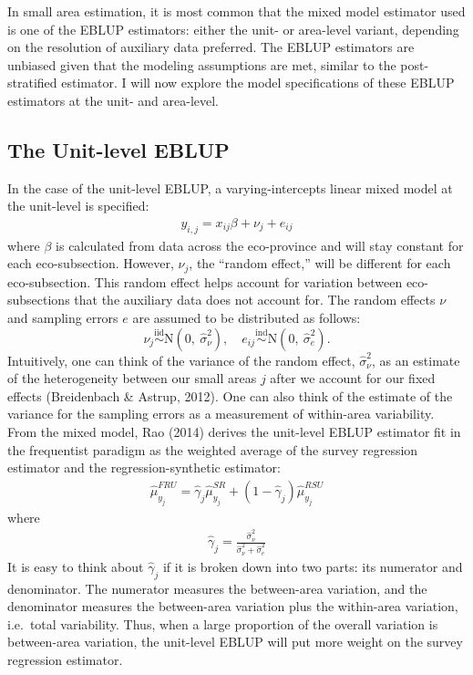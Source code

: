 \documentclass[12pt,twoside]{reedthesis}
\begin{document}
In small area estimation, it is most common that the mixed model estimator used is one of the EBLUP estimators: either the unit- or area-level variant, depending on the resolution of auxiliary data preferred. The EBLUP estimators are unbiased given that the modeling assumptions are met, similar to the post-stratified estimator. I will now explore the model specifications of these EBLUP estimators at the unit- and area-level.

\hypertarget{the-unit-level-eblup}{%
\subsection{The Unit-level EBLUP}\label{the-unit-level-eblup}}

In the case of the unit-level EBLUP, a varying-intercepts linear mixed model at the unit-level is specified:
\begin{align}
y_{i,j} = x_{ij} \beta + \nu_j + e_{ij} \label{eq:unit-mod}
\end{align}
where \(\beta\) is calculated from data across the eco-province and will stay constant for each eco-subsection. However, \(\nu_j\), the ``random effect,'' will be different for each eco-subsection. This random effect helps account for variation between eco-subsections that the auxiliary data does not account for. The random effects \(\nu\) and sampling errors \(e\) are assumed to be distributed as follows:
\[
 \newcommand\myeq{\stackrel{\mathclap{\normalfont\mbox{s}}}{~}}
\nu_j \stackrel{\text{iid}}{\sim} \text{N}(0,~ \hat\sigma^2_{\nu}), \quad
e_{ij} \stackrel{\text{ind}}{\sim}\text{N}(0,~\hat\sigma^2_e).
\]
Intuitively, one can think of the variance of the random effect, \(\hat\sigma^2_\nu\), as an estimate of the heterogeneity between our small areas \(j\) after we account for our fixed effects (Breidenbach \& Astrup, 2012). One can also think of the estimate of the variance for the sampling errors as a measurement of within-area variability. From the mixed model, Rao (2014) derives the unit-level EBLUP estimator fit in the frequentist paradigm as the weighted average of the survey regression estimator and the regression-synthetic estimator:
\begin{align}
\hat \mu_{y_j}^{FRU} = \hat \gamma_j \hat\mu_{y_j}^{SR} + (1 - \hat \gamma_j) \hat\mu_{y_j}^{RSU}
\end{align}
where
\begin{align}
\hat\gamma_j = \frac{\hat\sigma^2_\nu}{\hat\sigma^2_\nu + \hat\sigma^2_e}
\end{align}
It is easy to think about \(\hat\gamma_j\) if it is broken down into two parts: its numerator and denominator. The numerator measures the between-area variation, and the denominator measures the between-area variation plus the within-area variation, i.e.~total variability. Thus, when a large proportion of the overall variation is between-area variation, the unit-level EBLUP will put more weight on the survey regression estimator.
\end{document}
